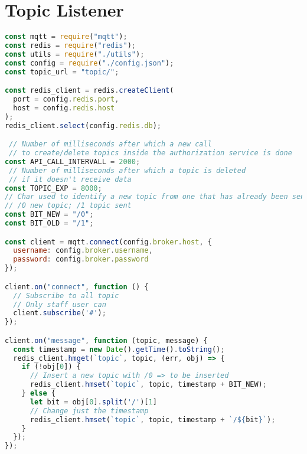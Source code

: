 \section{Topic Listener}
\begin{lstlisting}[language=javascript, caption={topic.js}, label={lst:topic}]
const mqtt = require("mqtt");
const redis = require("redis");
const utils = require("./utils");
const config = require("./config.json");
const topic_url = "topic/";

const redis_client = redis.createClient(
  port = config.redis.port,
  host = config.redis.host
);
redis_client.select(config.redis.db);

 // Number of milliseconds after which a new call
 // to create/delete topics inside the authorization service is done
const API_CALL_INTERVALL = 2000;
 // Number of milliseconds after which a topic is deleted
 // if it doesn't receive data
const TOPIC_EXP = 8000;
// Char used to identify a new topic from one that has already been sent.
// /0 new topic; /1 topic sent
const BIT_NEW = "/0";
const BIT_OLD = "/1";

const client = mqtt.connect(config.broker.host, {
  username: config.broker.username,
  password: config.broker.password
});

client.on("connect", function () {
  // Subscribe to all topic
  // Only staff user can
  client.subscribe('#');
});

client.on("message", function (topic, message) {
  const timestamp = new Date().getTime().toString();
  redis_client.hmget(`topic`, topic, (err, obj) => {
    if (!obj[0]) {
      // Insert a new topic with /0 => to be inserted
      redis_client.hmset(`topic`, topic, timestamp + BIT_NEW);
    } else {
      let bit = obj[0].split('/')[1]
      // Change just the timestamp
      redis_client.hmset(`topic`, topic, timestamp + `/${bit}`);
    }
  });
});


\end{lstlisting}
